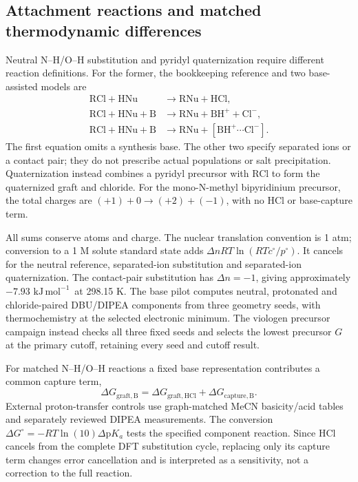\documentclass[11pt]{article}
\newcommand{\kj}{\ensuremath{\mathrm{kJ\,mol^{-1}}}}
\begin{document}
\subsection{Attachment reactions and matched thermodynamic differences}
Neutral N--H/O--H substitution and pyridyl quaternization require different reaction definitions. For the former, the bookkeeping reference and two base-assisted models are
\begin{align}
\mathrm{RCl+HNu}&\rightarrow\mathrm{RNu+HCl},\\
\mathrm{RCl+HNu+B}&\rightarrow\mathrm{RNu+BH^++Cl^-},\\
\mathrm{RCl+HNu+B}&\rightarrow\mathrm{RNu+[BH^+\cdots Cl^-]}.
\end{align}
The first equation omits a synthesis base. The other two specify separated ions or a contact pair; they do not prescribe actual populations or salt precipitation. Quaternization instead combines a pyridyl precursor with RCl to form the quaternized graft and chloride. For the mono-N-methyl bipyridinium precursor, the total charges are $(+1)+0\rightarrow(+2)+(-1)$, with no HCl or base-capture term.

All sums conserve atoms and charge. The nuclear translation convention is 1 atm; conversion to a 1 M solute standard state adds $\Delta nRT\ln(RTc^\circ/p^\circ)$. It cancels for the neutral reference, separated-ion substitution and separated-ion quaternization. The contact-pair substitution has $\Delta n=-1$, giving approximately $-7.93$ \kj\ at 298.15 K. The base pilot computes neutral, protonated and chloride-paired DBU/DIPEA components from three geometry seeds, with thermochemistry at the selected electronic minimum. The viologen precursor campaign instead checks all three fixed seeds and selects the lowest precursor $G$ at the primary cutoff, retaining every seed and cutoff result.

For matched N--H/O--H reactions a fixed base representation contributes a common capture term,
\begin{equation}
\Delta G_{\mathrm{graft,B}}=\Delta G_{\mathrm{graft,HCl}}+
\Delta G_{\mathrm{capture,B}}.
\label{eq:base}
\end{equation}
External proton-transfer controls use graph-matched MeCN basicity/acid tables and separately reviewed DIPEA measurements.\cite{basicity2019,acidity2013,pkaTables,barisic2021dipea,cook2024dipea} The conversion $\Delta G^\circ=-RT\ln(10)\Delta\mathrm{p}K_a$ tests the specified component reaction. Since HCl cancels from the complete DFT substitution cycle, replacing only its capture term changes error cancellation and is interpreted as a sensitivity, not a correction to the full reaction.
\end{document}
